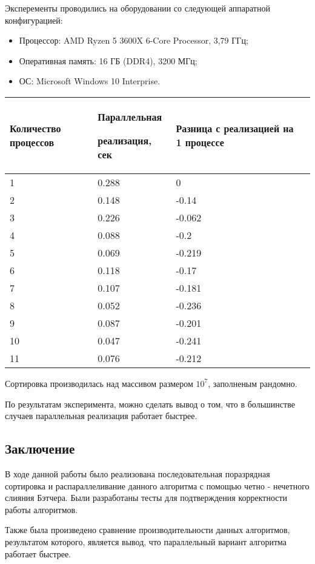 \documentclass{report}
\begin{document}
Эксперементы проводились на оборудовании со следующей аппаратной конфигурацией:
\begin{itemize}
\item Процессор: AMD Ryzen 5 3600X 6-Core Processor, 3,79 ГГц;
\item Оперативная память: 16 ГБ (DDR4), 3200 МГц;
\item ОС: Microsoft Windows 10 Interprise.
\end{itemize}
\begin{table}[h]
    \begin{tabular}{ | p{4cm} | p{4cm} | p{4cm} | p{4cm} | }
    \hline
    Количество процессов & Параллельная \par реализация, сек & Разница с реализацией на 1 процессе\\ \hline
    1    & 0.288  &0 \\ \hline
    2    & 0.148  &-0.14 \\ \hline
    3    & 0.226  &-0.062 \\ \hline
    4    & 0.088  &-0.2 \\ \hline
    5    & 0.069 &-0.219 \\ \hline 
    6    & 0.118 &-0.17 \\ \hline
    7    & 0.107  &-0.181 \\ \hline
    8    & 0.052  &-0.236 \\ \hline
    9    & 0.087  &-0.201\\ \hline
    10   & 0.047  &-0.241 \\ \hline
    11   & 0.076  &-0.212 \\ \hline
    \end{tabular}
\end{table}
\par Сортировка производилась над массивом размером $10^7$, заполненым рандомно.
\par По результатам эксперимента, можно сделать вывод о том, что в большинстве случаев параллельная реализация работает быстрее.

\newpage
\begin{center}
\section*{Заключение}
\end{center}

В ходе данной работы было реализована последовательная поразрядная сортировка и распараллеливание данного алгоритма с помощью четно - нечетного слияния Бэтчера. Были разработаны тесты для подтверждения корректности работы алгоритмов.
\par Также была произведено сравнение производительности данных алгоритмов, результатом которого, является вывод, что параллельный вариант алгоритма работает быстрее.
\end{document}
